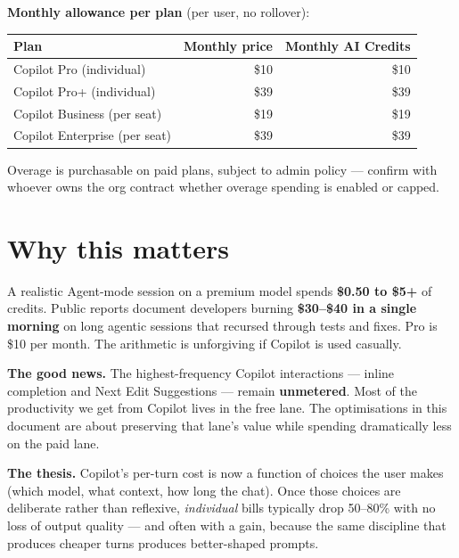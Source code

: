 \documentclass[11pt,a4paper]{article}
\begin{document}
\noindent\textbf{Monthly allowance per plan} (per user, no rollover):

\begin{table}[h]
\centering\small
\begin{tabular}{@{}lrr@{}}
\toprule
\textbf{Plan} & \textbf{Monthly price} & \textbf{Monthly AI Credits} \\
\midrule
Copilot Pro (individual)       & \$10           & \$10 \\
Copilot Pro+ (individual)      & \$39           & \$39 \\
Copilot Business (per seat)    & \$19           & \$19 \\
Copilot Enterprise (per seat)  & \$39           & \$39 \\
\bottomrule
\end{tabular}
\end{table}

Overage is purchasable on paid plans, subject to admin policy --- confirm with whoever owns the org contract whether overage spending is enabled or capped.

\section{Why this matters}\label{sec:why}

A realistic Agent-mode session on a premium model spends \textbf{\$0.50 to \$5+} of credits. Public reports document developers burning \textbf{\$30--\$40 in a single morning} on long agentic sessions that recursed through tests and fixes. Pro is \$10 per month. The arithmetic is unforgiving if Copilot is used casually.

\medskip
\noindent\textbf{The good news.} The highest-frequency Copilot interactions --- inline completion and Next Edit Suggestions --- remain \textbf{unmetered}. Most of the productivity we get from Copilot lives in the free lane. The optimisations in this document are about preserving that lane's value while spending dramatically less on the paid lane.

\medskip
\noindent\textbf{The thesis.} Copilot's per-turn cost is now a function of choices the user makes (which model, what context, how long the chat). Once those choices are deliberate rather than reflexive, \emph{individual} bills typically drop 50--80\% with no loss of output quality --- and often with a gain, because the same discipline that produces cheaper turns produces better-shaped prompts.
\end{document}

